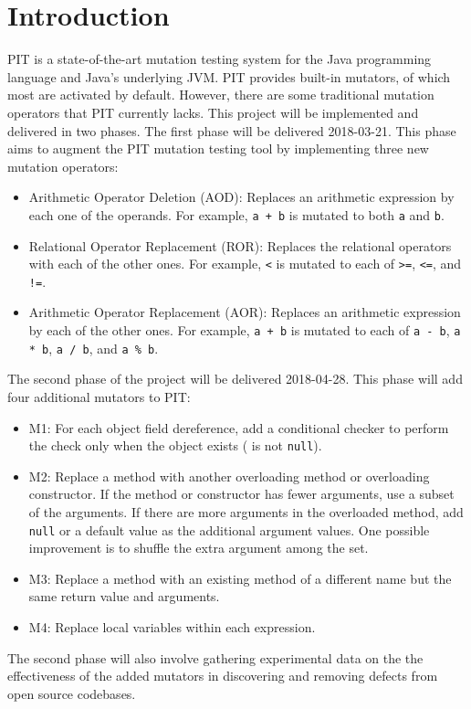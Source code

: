 \section{Introduction}

PIT is a state-of-the-art mutation testing system for the Java programming language and Java’s underlying JVM.
PIT provides built-in mutators, of which most are activated by default.
However, there are some traditional mutation operators that PIT currently lacks.
This project will be implemented and delivered in two phases.
The first phase will be delivered 2018-03-21.
This phase aims to augment the PIT mutation testing tool by implementing three new mutation operators:
\begin{itemize}
\item
  Arithmetic Operator Deletion (AOD):
  Replaces an arithmetic expression by each one of the operands.
  For example, \texttt{a + b} is mutated to both \texttt{a} and \texttt{b}.
\item
  Relational Operator Replacement (ROR):
  Replaces the relational operators with each of the other ones.
  For example, \texttt{<} is mutated to each of \texttt{>=}, \texttt{<=}, and \texttt{!=}.
\item
  Arithmetic Operator Replacement (AOR):
  Replaces an arithmetic expression by each of the other ones.
  For example, \texttt{a + b} is mutated to each of \texttt{a - b}, \texttt{a * b}, \texttt{a / b}, and \texttt{a \% b}.
\end{itemize}

The second phase of the project will be delivered 2018-04-28.  This phase will add four additional mutators to PIT:
\begin{itemize}
\item
  M1:
  For each object field dereference, add a conditional checker to perform the check only when the object exists (\ie{} is not \texttt{null}).
\item
  M2:
  Replace a method with another overloading method or overloading constructor.
  If the method or constructor has fewer arguments, use a subset of the arguments.
  If there are more arguments in the overloaded method, add \texttt{null} or a default value as the additional argument values.
  One possible improvement is to shuffle the extra argument among the set.
\item
  M3:
  Replace a method with an existing method of a different name but the same return value and arguments.
\item
  M4:
  Replace local variables within each expression.
\end{itemize}

The second phase will also involve gathering experimental data on the the effectiveness of the added mutators in discovering and removing defects from open source codebases.
